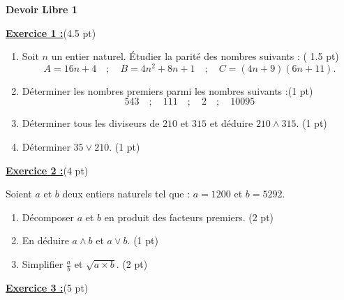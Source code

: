 \documentclass[12pt,a4paper]{article}
\begin{document}
\pagestyle{fancy}
\fancyhf{} %
\fancyfoot[C]{\thepage} %


\begin{center}
    \textbf{\Large  Devoir Libre 1}
\end{center}

\underline{\large\textbf{Exercice 1 :}}(4.5 pt)
\begin{enumerate}
    \item Soit $n$ un entier naturel. Étudier la parité des nombres suivants : ( 1.5 pt)
    $$A = 16n + 4\quad;\quad B = 4n^2 + 8n + 1 \quad;\quad C = (4n + 9)(6n + 11).$$
    \item Déterminer les nombres premiers parmi les nombres suivants :(1 pt)
    $$543\quad;\quad 111\quad;\quad 2\quad;\quad 10095$$
    \item Déterminer tous les diviseurs de $210$ et $315$ et déduire $210\wedge 315$. (1 pt)
    \item Déterminer $35\vee 210$. (1 pt)
\end{enumerate}

\underline{\large\textbf{Exercice 2 :}}(4 pt)

Soient $a$ et $b$ deux entiers naturels tel que : $a = 1200$ et $b = 5292$.
\begin{enumerate}
    \item Décomposer $a$ et $b$ en produit des facteurs premiers. (2 pt)
    \item En déduire $a\wedge b$ et $a\vee b$. (1 pt)
    \item Simplifier $\displaystyle\frac{a}{b}$ et $\sqrt{a\times b}$. (2 pt)
    
\end{enumerate}


\underline{\large\textbf{Exercice 3 :}}(5 pt)
\end{document}

